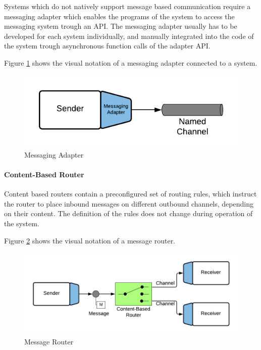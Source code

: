 Systems which do not natively support message based communication require a messaging adapter which enables the programs of the system to access the messaging system trough an API. The messaging adapter usually has to be developed for each system individually, and manually integrated into the code of the system trough asynchronous function calls of the adapter API.

Figure \ref{messaging:adapter} shows the visual notation of a messaging adapter connected to a system.

\begin{figure}[H]
    \centering
    \includegraphics[scale=0.6]{Diagrams/Messaging/4. Messaging Adapter.pdf}
    \caption{Messaging Adapter}
    \label{messaging:adapter}
\end{figure}

\paragraph{Content-Based Router}

Content based routers contain a preconfigured set of routing rules, which instruct the router to place inbound messages on different outbound channels, depending on their content. The definition of the rules does not change during operation of the system.

Figure \ref{messaging:router} shows the visual notation of a message router.

\begin{figure}[H]
    \centering
    \includegraphics[scale=0.6]{Diagrams/Messaging/5. Message Router.pdf}
    \caption{Message Router}
    \label{messaging:router}
\end{figure}

